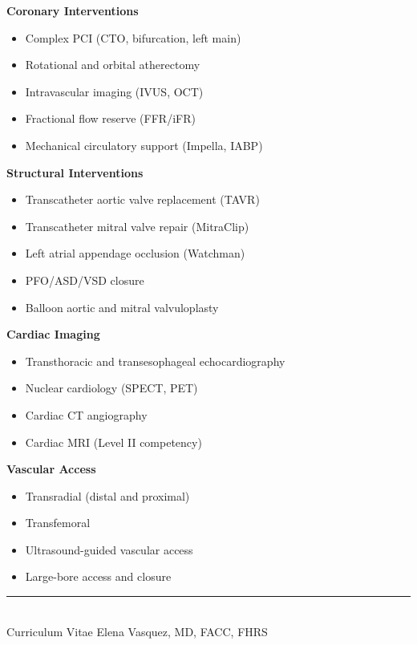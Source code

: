 \documentclass[11pt,a4paper]{article}
\begin{document}
\vspace{-2pt}
{\color{darktext}
\noindent
\begin{minipage}[t]{0.48\textwidth}
\textbf{\color{primary}Coronary Interventions}
\begin{itemize}[leftmargin=*, nosep, itemsep=0pt]
  \item Complex PCI (CTO, bifurcation, left main)
  \item Rotational and orbital atherectomy
  \item Intravascular imaging (IVUS, OCT)
  \item Fractional flow reserve (FFR/iFR)
  \item Mechanical circulatory support (Impella, IABP)
\end{itemize}
\end{minipage}%
\hfill
\begin{minipage}[t]{0.48\textwidth}
\textbf{\color{primary}Structural Interventions}
\begin{itemize}[leftmargin=*, nosep, itemsep=0pt]
  \item Transcatheter aortic valve replacement (TAVR)
  \item Transcatheter mitral valve repair (MitraClip)
  \item Left atrial appendage occlusion (Watchman)
  \item PFO/ASD/VSD closure
  \item Balloon aortic and mitral valvuloplasty
\end{itemize}
\end{minipage}
\par

\vspace{6pt}
\noindent
\begin{minipage}[t]{0.48\textwidth}
\textbf{\color{primary}Cardiac Imaging}
\begin{itemize}[leftmargin=*, nosep, itemsep=0pt]
  \item Transthoracic and transesophageal echocardiography
  \item Nuclear cardiology (SPECT, PET)
  \item Cardiac CT angiography
  \item Cardiac MRI (Level II competency)
\end{itemize}
\end{minipage}%
\hfill
\begin{minipage}[t]{0.48\textwidth}
\textbf{\color{primary}Vascular Access}
\begin{itemize}[leftmargin=*, nosep, itemsep=0pt]
  \item Transradial (distal and proximal)
  \item Transfemoral
  \item Ultrasound-guided vascular access
  \item Large-bore access and closure
\end{itemize}
\end{minipage}
\par
}

\vfill
\begin{center}
{\color{primary!40}\rule{0.6\textwidth}{0.3pt}}\\[4pt]
{\color{primary!50}\footnotesize Curriculum Vitae \textbar{} Elena Vasquez, MD, FACC, FHRS}
\end{center}
\end{document}

